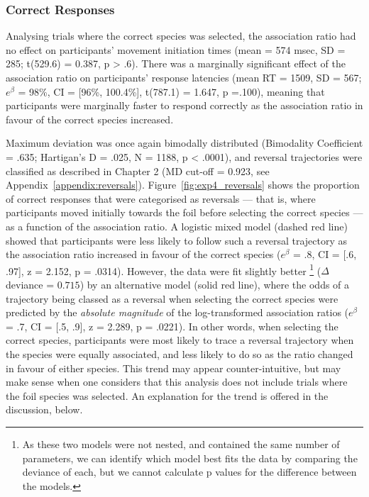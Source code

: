 \FloatBarrier
\subsubsection{Correct Responses}

Analysing trials where the correct species was selected,
the association ratio had no effect on participants' movement initiation times
(mean = 574 msec, SD = 285; t(529.6) = 0.387, p > .6).
There was a marginally significant effect of the association ratio
on participants' response latencies
(mean RT = 1509, SD = 567;
$e^{\beta}$ = 98\%, CI = [96\%, 100.4\%], t(787.1) = 1.647, p =.100),
meaning that participants were marginally faster to respond correctly
as the association ratio in favour of the correct species increased.

Maximum deviation was once again bimodally distributed
(Bimodality Coefficient = .635; Hartigan's D = .025, N = 1188, p < .0001),
and reversal trajectories were classified
as described in Chapter 2 (MD cut-off = 0.923, see Appendix~\ref{appendix:reversals}).
Figure~\ref{fig:exp4_reversals} shows the proportion of correct responses
that were categorised as reversals ---
that is, where participants moved initially towards the foil
before selecting the correct species ---
as a function of the association ratio.
A logistic mixed model (dashed red line) showed that
participants were less likely to follow such a reversal trajectory
as the association ratio increased in favour of the correct species
($e^{\beta}$ = .8, CI = [.6, .97], z = 2.152, p = .0314).
However, the data were fit slightly better%
\footnote{
  As these two models were not nested,
  and contained the same number of parameters,
  we can identify which model best fits the data
  by comparing the deviance of each,
  but we cannot calculate p values for
  the difference between the models.
}
($\Delta$deviance = $0.715$)
by an alternative model (solid red line),
where the odds of a trajectory being classed as a reversal
when selecting the correct species
were predicted by the \emph{absolute magnitude} of the log-transformed association ratios
($e^{\beta}$ = .7, CI = [.5, .9], z = 2.289, p = .0221).
In other words, when selecting the correct species,
participants were most likely to trace a reversal trajectory
when the species were equally associated,
and less likely to do so as the ratio changed in favour of either species.
This trend may appear counter-intuitive,
but may make sense when one considers that
this analysis does not include trials where the foil species was selected.
An explanation for the trend is offered in the discussion, below.


